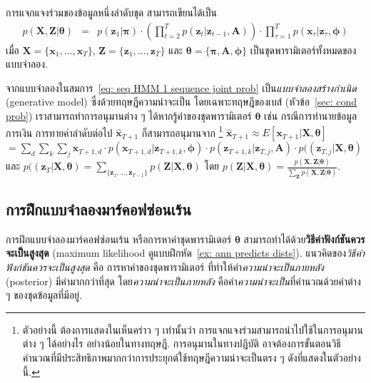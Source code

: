 การแจกแจงร่วมของข้อมูลหนึ่งลำดับชุด สามารถเขียนได้เป็น
\begin{eqnarray}
p(\bm{X}, \bm{Z}| \bm{\theta})
&=&
p(\bm{z}_1|\bm{\pi}) \cdot \left( \prod_{t=2}^T p(\bm{z}_t|\bm{z}_{t-1}, \bm{A}) \right)
\cdot \prod_{\tau=1}^T p(\bm{x}_\tau|\bm{z}_\tau, \bm{\phi})
\label{eq: seq HMM 1 sequence joint prob}
\end{eqnarray}
เมื่อ $\bm{X} = \{\bm{x}_1, \ldots, \bm{x}_T\}$,
$\bm{Z} = \{\bm{z}_1, \ldots, \bm{z}_T\}$
และ $\bm{\theta} = \{ \bm{\pi}, \bm{A}, \bm{\phi}  \}$ เป็นชุดพารามิเตอร์ทั้งหมดของแบบจำลอง.

จากแบบจำลองในสมการ~\ref{eq: seq HMM 1 sequence joint prob}
เป็น\textit{แบบจำลองสร้างกำเนิด} (generative model)
ซึ่งด้วยทฤษฎีความน่าจะเป็น โดยเฉพาะทฤษฎีของเบส์ (หัวข้อ~\ref{sec: cond prob})
เราสามารถทำการอนุมานต่าง ๆ ได้หากรู้ค่าของชุดพารามิเตอร์ $\bm{\theta}$
เช่น 
กรณีการทำนายข้อมูลการเงิน การทายค่าลำดับต่อไป $\hat{\bm{x}}_{T+1}$ ก็สามารถอนุมานจาก%
\footnote{%
ตัวอย่างนี้ ต้องการแสดงในเห็นคร่าว ๆ เท่านั้นว่า การแจกแจงร่วมสามารถนำไปใช้ในการอนุมานต่าง ๆ ได้อย่างไร อย่างน้อยในทางทฤษฎี.
การอนุมานในทางปฎิบัติ อาจต้องการขั้นตอนวิธีคำนวณที่มีประสิทธิภาพมากกว่าการประยุกต์ใช้ทฤษฎีความน่าจะเป็นตรง ๆ ดังที่แสดงในตัวอย่างนี้.
}
$\hat{\bm{x}}_{T+1} \approx E[\bm{x}_{T+1}|\bm{X}, \bm{\theta}]$
$=\sum_d \sum_k \sum_j \bm{x}_{T+1,d} \cdot p(\bm{x}_{T+1,d}|\bm{z}_{T+1, k}, \bm{\phi}) \cdot p(\bm{z}_{T+1, k}|\bm{z}_{T,j}, \bm{A}) \cdot  p((\bm{z}_{T,j}|\bm{X}, \bm{\theta})$
และ
$p((\bm{z}_T|\bm{X}, \bm{\theta}) = \sum_{\{\bm{z}_1, \ldots,  \bm{z}_{T-1}\}} p(\bm{Z}|\bm{X}, \bm{\theta})$
โดย
$p(\bm{Z}|\bm{X}, \bm{\theta}) = \frac{p(\bm{X}, \bm{Z}|\bm{\theta})}{\sum_{\bm{Z}} p(\bm{X},\bm{Z}|\bm{\theta})}$.

\subsection{การฝึกแบบจำลองมาร์คอฟซ่อนเร้น}
\label{sec: seq HMM train}

การฝึกแบบจำลองมาร์คอฟซ่อนเร้น หรือการหาค่าชุดพารามิเตอร์ $\bm{\theta}$ 
สามารถทำได้ด้วย\textbf{วิธีค่าฟังก์ชันควรจะเป็นสูงสุด} (maximum likelihood ดูแบบฝึกหัด~\ref{ex: ann predicts dists}).
แนวคิดของ\textit{วิธีค่าฟังก์ชันควรจะเป็นสูงสุด} 
คือ การหาค่าของชุดพารามิเตอร์ ที่ทำให้ค่า\textit{ความน่าจะเป็นภายหลัง} (posterior) มีค่ามากกว่าที่สุด
โดย\textit{ความน่าจะเป็นภายหลัง} คือค่า\textit{ความน่าจะเป็น}ที่คำนวณด้วยค่าต่าง ๆ ของชุดข้อมูลที่มีอยู่.


